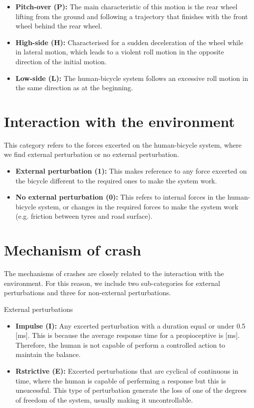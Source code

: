 \documentclass{article}
\begin{document}
\begin{itemize}
    \item \textbf{Pitch-over (P):} The main characteristic of this motion is the rear wheel lifting from the ground and following a trajectory that finishes with the front wheel behind the rear wheel.
    \item \textbf{High-side (H):} Characterised for a sudden deceleration of the wheel while in lateral motion, which leads to a violent roll motion in the opposite direction of the initial motion.
    \item \textbf{Low-side (L):} The human-bicycle system follows an excessive roll motion in the same direction as at the beginning.
\end{itemize}

\section{Interaction with the environment}

This category refers to the forces excerted on the human-bicycle system, where we find external perturbation or no external perturbation.

\begin{itemize}
    \item \textbf{External perturbation (1):} This makes reference to any force excerted on the bicycle different to the required ones to make the system work. 
    \item \textbf{No external perturbation (0):} This refers to internal forces in the human-bicycle system, or changes in the required forces to make the system work (e.g. friction between tyres and road surface).
\end{itemize}

\section{Mechanism of crash}

The mechanisms of crashes are closely related to the interaction with the environment.
%
For this reason, we include two sub-categories for external perturbations and three for non-external perturbations.

External perturbations
\begin{itemize}
    \item \textbf{Impulse (I):} Any excerted perturbation with a duration equal or under 0.5 [ms].
        This is because the average response time for a propioceptive {} is {} [ms].
        Therefore, the human is not capable of perform a controlled action to maintain the balance.
    \item \textbf{Rstrictive (E):} Excerted perturbations that are cyclical of continuous in time, where the human is capable of perferming a response but this is unsucessful.
        This type of perturbation generate the loss of one of the degrees of freedom of the system, usually making it uncontrollable.
\end{itemize}
\end{document}
